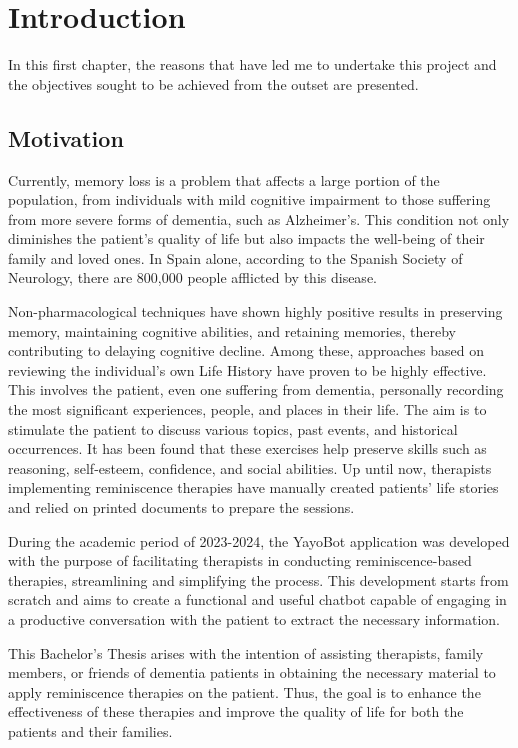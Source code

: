 \chapter*{Introduction}
\label{cap:introduction}

In this first chapter, the reasons that have led me to undertake this project and the objectives sought to be achieved from the outset are presented.


\section{Motivation}
Currently, memory loss is a problem that affects a large portion of the population, from individuals with mild cognitive impairment to those suffering from more severe forms of dementia, such as Alzheimer's. This condition not only diminishes the patient's quality of life but also impacts the well-being of their family and loved ones. In Spain alone, according to the Spanish Society of Neurology, there are 800,000 people afflicted by this disease.

Non-pharmacological techniques have shown highly positive results in preserving memory, maintaining cognitive abilities, and retaining memories, thereby contributing to delaying cognitive decline. Among these, approaches based on reviewing the individual's own Life History have proven to be highly effective. This involves the patient, even one suffering from dementia, personally recording the most significant experiences, people, and places in their life. The aim is to stimulate the patient to discuss various topics, past events, and historical occurrences. It has been found that these exercises help preserve skills such as reasoning, self-esteem, confidence, and social abilities. Up until now, therapists implementing reminiscence therapies have manually created patients' life stories and relied on printed documents to prepare the sessions.

During the academic period of 2023-2024, the YayoBot application was developed with the purpose of facilitating therapists in conducting reminiscence-based therapies, streamlining and simplifying the process. This development starts from scratch and aims to create a functional and useful chatbot capable of engaging in a productive conversation with the patient to extract the necessary information.

This Bachelor's Thesis arises with the intention of assisting therapists, family members, or friends of dementia patients in obtaining the necessary material to apply reminiscence therapies on the patient. Thus, the goal is to enhance the effectiveness of these therapies and improve the quality of life for both the patients and their families.


